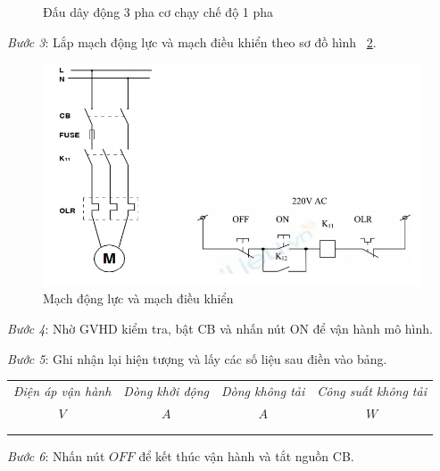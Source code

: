 \documentclass[13pt,a4paper]{extarticle}
\begin{document}
\begin{list}{--}{}
\begin{figure}[!h]
\begin{center}
\end{center}
\caption{Đấu dây động 3 pha cơ chạy chế độ 1 pha}\label{3p-1p}
\end{figure}
\item \textit{Bước 3}: Lắp mạch động lực và mạch điều khiển theo sơ đồ hình ~\ref{mach-dong-luc-tu-de}.
\begin{figure}[!h]
\begin{center}
\includegraphics[scale=.6]{mach-dluc-dkhien}
\end{center}
\caption{Mạch động lực và mạch điều khiển}\label{mach-dong-luc-tu-de}
\end{figure}
\item \textit{Bước 4}: Nhờ GVHD kiểm tra, bật CB và nhấn nút ON để vận hành mô hình.
\item \textit{Bước 5}: Ghi nhận lại hiện tượng và lấy các số liệu sau điền vào bảng.
\begin{center}
\begin{tabular}{|c|c|c|c|}\hline
\textit{Điện áp vận hành} & \textit{Dòng khởi động} & \textit{Dòng không tải} & \textit{Công suất không tải}\\ 
$V$ & $A$ & $A$ & $W$ \\ \hline
& & & \\ \hline
& & & \\ \hline
\end{tabular}
\end{center}
\item \textit{Bước 6}: Nhấn nút $OFF$ để kết thúc vận hành và tắt nguồn CB.
\end{list}
\newpage
\end{document}
